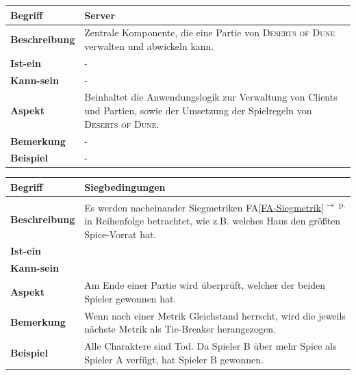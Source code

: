 \documentclass[12pt]{article}
\newcounter{fa}
\newcommand{\faref}[1]{FA\ref{#1}\textsuperscript{$\rightarrow$ p. \pageref{#1}}}
\begin{document}
\begin{tabularx}{\linewidth}{|l|X|}
\hline
\textbf{Begriff} & \textbf{Server} \\
\hline
\textbf{Beschreibung} & Zentrale Komponente, die eine Partie von \textsc{Deserts of Dune} verwalten und abwickeln kann. \\
\hline
\textbf{Ist-ein} & - \\
\hline
\textbf{Kann-sein} & - \\
\hline
\textbf{Aspekt} & Beinhaltet die Anwendungslogik zur Verwaltung von Clients und Partien, sowie der Umsetzung der Spielregeln von \textsc{Deserts of Dune}. \\
\hline
\textbf{Bemerkung} & - \\
\hline
\textbf{Beispiel} & - \\
\hline
\end{tabularx}

\begin{tabularx}{\linewidth}{|l|X|}
\hline
\textbf{Begriff} & \textbf{Siegbedingungen} \\
\hline
\textbf{Beschreibung} & Es werden nacheinander Siegmetriken \faref{FA-Siegmetrik} in Reihenfolge betrachtet, wie z.B. welches Haus den größten Spice-Vorrat hat. \\
\hline
\textbf{Ist-ein} & \\
\hline
\textbf{Kann-sein} & \\
\hline
\textbf{Aspekt} & Am Ende einer Partie wird überprüft, welcher der beiden Spieler gewonnen hat. \\
\hline
\textbf{Bemerkung} & Wenn nach einer Metrik Gleichstand herrscht, wird die jeweils nächste Metrik als Tie-Breaker herangezogen. \\
\hline
\textbf{Beispiel} & Alle Charaktere sind Tod. Da Spieler B über mehr Spice als Spieler A verfügt, hat Spieler B gewonnen. \\
\hline
\end{tabularx}
\end{document}
